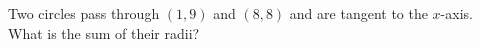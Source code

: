 Two circles pass through $(1,9)$ and $(8,8)$ and are tangent to the $x$-axis. What is the sum of their radii?
